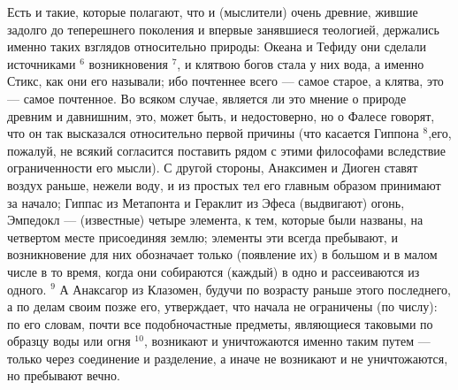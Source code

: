 \documentclass[oneside, 17pt, dvipsnames]{extbook}
\begin{document}
Есть и такие, которые полагают, что и (мыслители) очень древние, жившие задолго до теперешнего поколения и впервые занявшиеся теологией, держались именно таких взглядов относительно природы: Океана и Тефиду они сделали источниками $^6$
возникновения $^7$, и клятвою богов стала у них вода, а именно Стикс, как они его называли; ибо почтеннее всего — самое старое, а клятва, это — самое почтенное. Во всяком случае, является ли это мнение о природе древним и давнишним, это, может быть, и недостоверно, но о Фалесе говорят, что он так высказался относительно первой причины (что касается Гиппона $^8$,его, пожалуй, не всякий согласится поставить рядом с этими философами вследствие ограниченности его мысли). С другой стороны, Анаксимен и Диоген ставят воздух раньше, нежели воду, и из простых тел его главным образом принимают за начало; Гиппас из Метапонта и Гераклит из Эфеса (выдвигают) огонь, Эмпедокл — (известные) четыре элемента, к тем, которые были названы, на четвертом месте присоединяя землю; элементы эти всегда пребывают, и возникновение для них обозначает только (появление их) в большом и в малом числе в то время, когда они собираются (каждый) в одно и рассеиваются из одного. $^9$ А Анаксагор из Клазомен, будучи по возрасту раньше этого последнего, а по делам своим позже его, утверждает, что начала не ограничены (по числу): по его словам, почти все подобночастные предметы, являющиеся таковыми по образцу воды или огня $^{10}$, возникают и уничтожаются именно таким путем — только через соединение и разделение, а иначе не возникают и не уничтожаются, но пребывают вечно.
\end{document}
